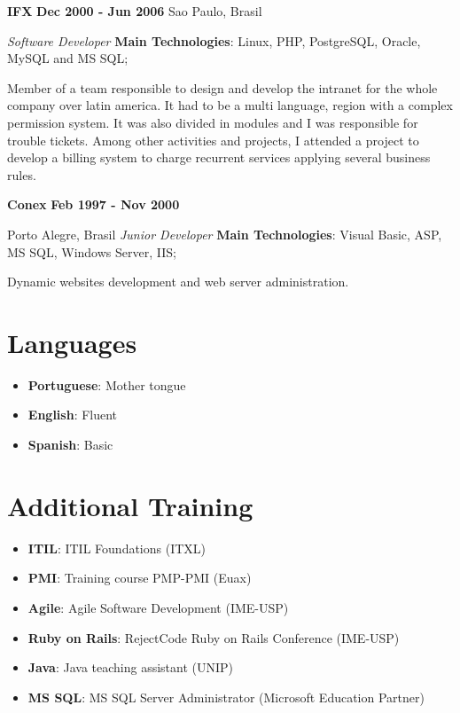 \textbf{IFX} 											\textbf{Dec 2000 - Jun 2006}
Sao Paulo, Brasil

\emph{Software Developer}
\textbf{Main Technologies}: Linux, PHP, PostgreSQL, Oracle, MySQL and MS SQL;

Member of a team responsible to design and develop the intranet for the whole company over latin america. It had to be a multi language, region with a complex permission system. It was also divided in modules and I was responsible for trouble tickets. Among other activities and projects, I attended a project to develop a billing system to charge recurrent services applying several business rules.

\textbf{Conex} 											\textbf{Feb 1997 - Nov 2000}

Porto Alegre, Brasil
\emph{Junior Developer}
\textbf{Main Technologies}: Visual Basic, ASP, MS SQL, Windows Server, IIS;

Dynamic websites development and web server administration.

\part{Languages}
\label{languages}

\begin{itemize}
\item \textbf{Portuguese}: Mother tongue

\item \textbf{English}: Fluent

\item \textbf{Spanish}: Basic

\end{itemize}

\part{Additional Training}
\label{additionaltraining}

\begin{itemize}
\item \textbf{ITIL}: ITIL Foundations (ITXL)

\item \textbf{PMI}: Training course PMP-PMI (Euax)

\item \textbf{Agile}: Agile Software Development (IME-USP)

\item \textbf{Ruby on Rails}: RejectCode Ruby on Rails Conference (IME-USP)

\item \textbf{Java}: Java teaching assistant (UNIP)

\item \textbf{MS SQL}: MS SQL Server Administrator (Microsoft Education Partner)

\end{itemize}

